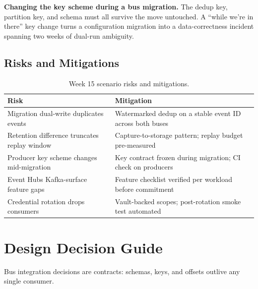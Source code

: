 \begin{pitfall}
\textbf{Changing the key scheme during a bus migration.} The dedup key, partition key, and schema must all survive the move untouched. A ``while we're in there'' key change turns a configuration migration into a data-correctness incident spanning two weeks of dual-run ambiguity.
\end{pitfall}

\subsection{Risks and Mitigations}
\begin{table}[H]
\centering
\small
\begin{tabular}{@{}p{4.6cm}p{7.6cm}@{}}
\toprule
\textbf{Risk} & \textbf{Mitigation} \\
\midrule
Migration dual-write duplicates events & Watermarked dedup on a stable event ID across both buses \\
Retention difference truncates replay window & Capture-to-storage pattern; replay budget pre-measured \\
Producer key scheme changes mid-migration & Key contract frozen during migration; CI check on producers \\
Event Hubs Kafka-surface feature gaps & Feature checklist verified per workload before commitment \\
Credential rotation drops consumers & Vault-backed scopes; post-rotation smoke test automated \\
\bottomrule
\end{tabular}
\caption{Week 15 scenario risks and mitigations.}
\label{tab:ch15-risks}
\end{table}

\section{Design Decision Guide}
%
Bus integration decisions are contracts: schemas, keys, and offsets outlive any single consumer.

